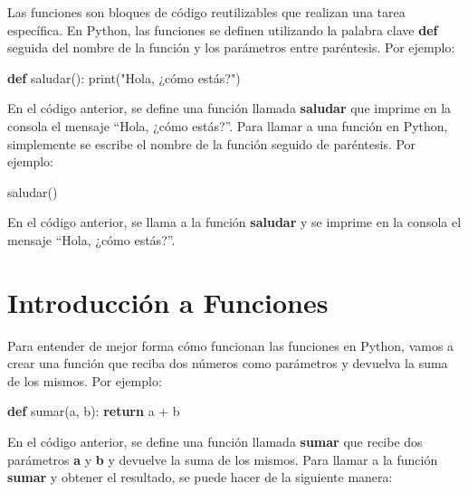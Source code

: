 \documentclass[
  a4paper,
  DIV=11,
  numbers=noendperiod,
  onepage,
  openany]{scrreprt}
\newenvironment{Shaded}{\begin{snugshade}}{\end{snugshade}}
\newcommand{\BuiltInTok}[1]{\textcolor[rgb]{0.00,0.23,0.31}{#1}}
\newcommand{\ControlFlowTok}[1]{\textcolor[rgb]{0.00,0.23,0.31}{\textbf{#1}}}
\newcommand{\KeywordTok}[1]{\textcolor[rgb]{0.00,0.23,0.31}{\textbf{#1}}}
\newcommand{\NormalTok}[1]{\textcolor[rgb]{0.00,0.23,0.31}{#1}}
\newcommand{\OperatorTok}[1]{\textcolor[rgb]{0.37,0.37,0.37}{#1}}
\newcommand{\StringTok}[1]{\textcolor[rgb]{0.13,0.47,0.30}{#1}}
\begin{document}
Las funciones son bloques de código reutilizables que realizan una tarea
específica. En Python, las funciones se definen utilizando la palabra
clave \textbf{def} seguida del nombre de la función y los parámetros
entre paréntesis. Por ejemplo:

\begin{Shaded}
\begin{Highlighting}[]
\KeywordTok{def}\NormalTok{ saludar():}
    \BuiltInTok{print}\NormalTok{(}\StringTok{"Hola, ¿cómo estás?"}\NormalTok{)}
\end{Highlighting}
\end{Shaded}

En el código anterior, se define una función llamada \textbf{saludar}
que imprime en la consola el mensaje ``Hola, ¿cómo estás?''. Para llamar
a una función en Python, simplemente se escribe el nombre de la función
seguido de paréntesis. Por ejemplo:

\begin{Shaded}
\begin{Highlighting}[]
\NormalTok{saludar()}
\end{Highlighting}
\end{Shaded}

En el código anterior, se llama a la función \textbf{saludar} y se
imprime en la consola el mensaje ``Hola, ¿cómo estás?''.

\section{Introducción a Funciones}\label{introducciuxf3n-a-funciones}

Para entender de mejor forma cómo funcionan las funciones en Python,
vamos a crear una función que reciba dos números como parámetros y
devuelva la suma de los mismos. Por ejemplo:

\begin{Shaded}
\begin{Highlighting}[]
\KeywordTok{def}\NormalTok{ sumar(a, b):}
    \ControlFlowTok{return}\NormalTok{ a }\OperatorTok{+}\NormalTok{ b}
\end{Highlighting}
\end{Shaded}

En el código anterior, se define una función llamada \textbf{sumar} que
recibe dos parámetros \textbf{a} y \textbf{b} y devuelve la suma de los
mismos. Para llamar a la función \textbf{sumar} y obtener el resultado,
se puede hacer de la siguiente manera:
\end{document}
